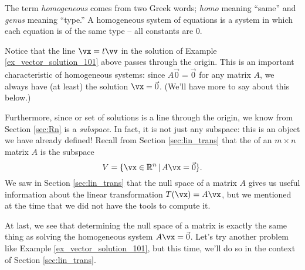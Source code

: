 \smallskip

The term \textit{homogeneous} comes from two Greek words; \textit{homo} meaning ``same'' and \textit{genus} meaning ``type.'' A homogeneous system of equations is a system in which each equation is of the same type -- all constants are 0. 

Notice that the line $\vx =t\vv$ in the solution of Example \ref{ex_vector_solution_101} above passes through the origin. This is an important characteristic of homogeneous systems: since $A\vec 0 = \vec 0$ for any matrix $A$, we always have (at least) the solution $\vx = \vec 0$. (We'll have more to say about this below.)

Furthermore, since or set of solutions is a line through the origin, we know from Section \ref{sec:Rn} is a \textit{subspace}. In fact, it is not just any subspace: this is an object we have already defined! Recall from Section \ref{sec:lin_trans} that the  of an $m\times n$ matrix $A$ is the subspace
\[
V = \{\vx\in\R^n \, | \, A\vx = \vec 0\}.
\]
We saw in Section \ref{sec:lin_trans} that the null space of a matrix $A$ gives us useful information about the linear transformation $T(\vx) = A\vx$, but we mentioned at the time that we did not have the tools to compute it.

At last, we see that determining the null space of a matrix is exactly the same thing as solving the homogeneous system $A\vx = \vec 0$. Let's try another problem like Example \ref{ex_vector_solution_101}, but this time, we'll do so in the context of Section \ref{sec:lin_trans}.

\medskip

